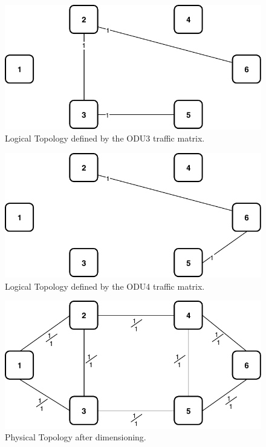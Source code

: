 \begin{figure}[h!]
\centering
\includegraphics[width=12cm]{sdf/ilp/transparent_protection/figures/logical_topology_ODU3_low}
\caption{Logical Topology defined by the ODU3 traffic matrix.}
\label{logical2_ODU3_protectionlow}
\end{figure}

\begin{figure}[h!]
\centering
\includegraphics[width=12cm]{sdf/ilp/transparent_protection/figures/logical_topology_ODU4_low}
\caption{Logical Topology defined by the ODU4 traffic matrix.}
\label{logical2_ODU4_protectionlow}
\end{figure}

\begin{figure}[h!]
\centering
\includegraphics[width=12cm]{sdf/ilp/transparent_protection/figures/physical_topology}
\caption{Physical Topology after dimensioning.}
\label{physical2_protectionlow}
\end{figure}

